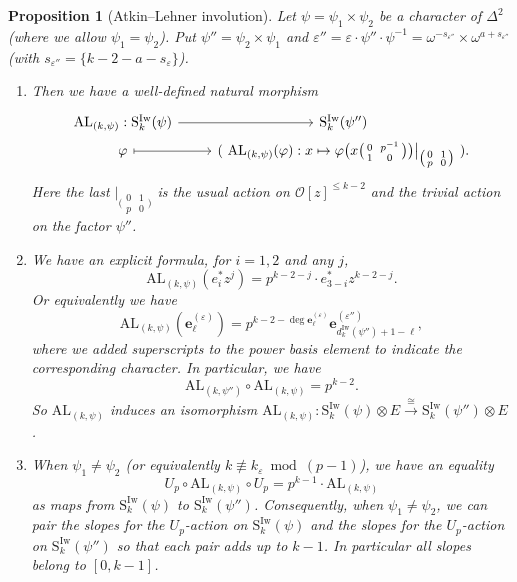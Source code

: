 \documentclass[12pt]{amsart}
\newtheorem{proposition}[subsection]{Proposition}
\theoremstyle{definition}
\numberwithin{equation}{subsection}
\def\calO{\mathcal{O}}
\def\bfe{\mathbf{e}}
\def\rmS{\mathrm{S}}
\newcommand{\AL}{\mathrm{AL}}
\newcommand{\Iw}{\mathrm{Iw}}
\newcommand{\Matrix}[4]{{\big(\begin{smallmatrix}#1&#2\\#3& #4\end{smallmatrix} \big)}}
\begin{document}
\begin{proposition}[Atkin--Lehner involution] \label{P:Atkin-Lehner duality}
Let $\psi = \psi_1 \times \psi_2$ be a character of $\Delta^2$ (where we allow $\psi_1 = \psi_2$). Put $\psi'' = \psi_2 \times \psi_1$ and $\varepsilon''= \varepsilon \cdot \psi'' \cdot \psi^{-1} = \omega^{-s_{\varepsilon''}} \times \omega^{a+s_{\varepsilon''}}$ (with $s_{\varepsilon''} = \{k-2-a-s_\varepsilon\}$).

\begin{enumerate}
\item 
Then we have a well-defined natural morphism
\begin{equation}
\label{E:Atkin-Lehner map}
\begin{tikzcd}[row sep =0pt]
\AL_{(k, \psi)}: \rmS_{k}^{\Iw}( \psi)  \ar[r] &  \rmS_{k}^{\Iw}( \psi'')
\\
\varphi \ar[r, mapsto] & (\ \AL_{(k, \psi)}(\varphi): x \mapsto \varphi \big(x \Matrix 0{p^{-1}}10 \big)\big|_{\Matrix 01p0} \ ).
\end{tikzcd}
\end{equation}
Here the last $|_{\Matrix 01p0}$ is the usual action on $\calO[z]^{\leq k-2}$ and the \emph{trivial} action on the factor $\psi''$. 

\item 
We have an explicit formula, for $i=1,2$ and any $j$,
$$
\AL_{(k,\psi)} (e_i^* z^j) = p^{k-2-j} \cdot e_{3-i}^* z^{k-2-j}.
$$
Or equivalently we have
\begin{equation}
\label{E:AL swaps power basis elements}\AL_{(k,\psi)}(\bfe_\ell^{(\varepsilon)}) = p^{k-2-\deg \bfe_\ell^{(\varepsilon)}}\bfe^{(\varepsilon'')}_{d_k^\Iw(\psi'')+1-\ell},
\end{equation}
where we added superscripts to the power basis element to indicate the corresponding character.
In particular, we have
\begin{equation}
\label{E:AL circ AL}
\AL_{(k, \psi'')} \circ \AL_{(k, \psi)} = p^{k-2}.
\end{equation}
So $\AL_{(k, \psi)}$ induces an isomorphism $\AL_{(k,\psi)}: \rmS_{k}^\Iw(\psi)\otimes E \xrightarrow{\cong}\rmS_{k}^\Iw(\psi'') \otimes E$.  

\item
When $\psi_1 \neq \psi_2$ (or equivalently $k \not\equiv k_\varepsilon \bmod{(p-1)}$), we have an equality
\begin{equation}
\label{E:Atkin-Lehner involution}
U_p \circ \AL_{(k, \psi)} \circ U_p = p^{k-1} \cdot \AL_{(k, \psi)}
\end{equation}
as maps from $\rmS_{k}^{\Iw}( \psi)$ to $\rmS_{k}^{\Iw}( \psi'')$.
Consequently, when $\psi_1 \neq \psi_2$,  we can pair the slopes for the $U_p$-action on $\rmS_{k}^{\Iw}( \psi)$ and the slopes for the $U_p$-action on $\rmS_{k}^{\Iw}( \psi'')$ so that each pair adds up to $k-1$. In particular all slopes belong to $[0, k-1]$.
\end{enumerate}
\end{proposition}
\end{document}
